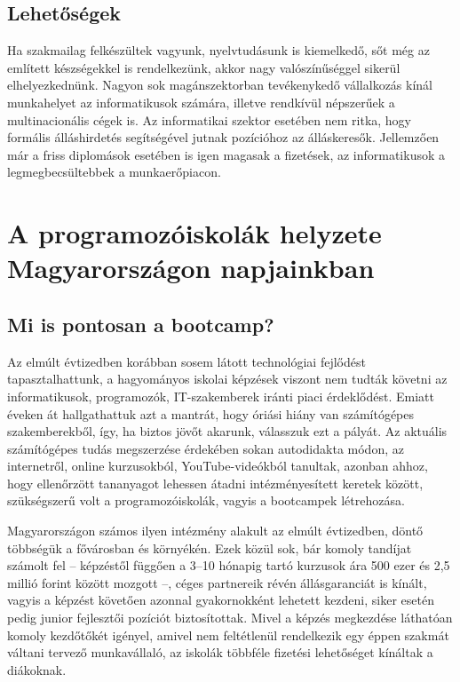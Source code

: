 \documentclass{thesis-ekf}
\begin{document}
\section{Lehetőségek}
Ha szakmailag felkészültek vagyunk, nyelvtudásunk is kiemelkedő, sőt még az említett készségekkel is rendelkezünk, akkor nagy valószínűséggel sikerül elhelyezkednünk. Nagyon sok magánszektorban tevékenykedő vállalkozás kínál munkahelyet az informatikusok számára, illetve rendkívül népszerűek a multinacionális cégek is. Az informatikai szektor esetében nem ritka, hogy formális álláshirdetés segítségével jutnak pozícióhoz az álláskeresők. Jellemzően már a friss diplomások esetében is igen magasak a fizetések, az informatikusok a legmegbecsültebbek a munkaerőpiacon. \cite{informatika_oktatas}

\chapter{A programozóiskolák helyzete Magyarországon napjainkban}
\section{Mi is pontosan a bootcamp?}
Az elmúlt évtizedben korábban sosem látott technológiai fejlődést tapasztalhattunk, a hagyományos iskolai képzések viszont nem tudták követni az informatikusok, programozók, IT-szakemberek iránti piaci érdeklődést. Emiatt éveken át hallgathattuk azt a mantrát, hogy óriási hiány van számítógépes szakemberekből, így, ha biztos jövőt akarunk, válasszuk ezt a pályát. Az aktuális számítógépes tudás megszerzése érdekében sokan autodidakta módon, az internetről, online kurzusokból, YouTube-videókból tanultak, azonban ahhoz, hogy ellenőrzött tananyagot lehessen átadni intézményesített keretek között, szükségszerű volt a programozóiskolák, vagyis a bootcampek létrehozása.

Magyarországon számos ilyen intézmény alakult az elmúlt évtizedben, döntő többségük a fővárosban és környékén. Ezek közül sok, bár komoly tandíjat számolt fel – képzéstől függően a 3–10 hónapig tartó kurzusok ára 500 ezer és 2,5 millió forint között mozgott –, céges partnereik révén állásgaranciát is kínált, vagyis a képzést követően azonnal gyakornokként lehetett kezdeni, siker esetén pedig junior fejlesztői pozíciót biztosítottak. Mivel a képzés megkezdése láthatóan komoly kezdőtőkét igényel, amivel nem feltétlenül rendelkezik egy éppen szakmát váltani tervező munkavállaló, az iskolák többféle fizetési lehetőséget kínáltak a diákoknak. \cite{bootcamp}
\end{document}
